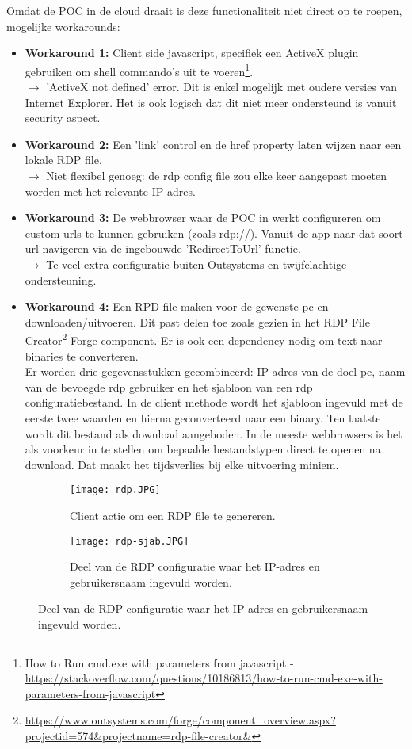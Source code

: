 Omdat de POC in de cloud draait is deze functionaliteit niet direct op te roepen, mogelijke workarounds:
\begin{itemize}
    \item \textbf{Workaround 1:} Client side javascript, specifiek een ActiveX plugin gebruiken om shell commando's uit te voeren\footnote{How to Run cmd.exe with parameters from javascript - \url{https://stackoverflow.com/questions/10186813/how-to-run-cmd-exe-with-parameters-from-javascript}}.\\
    $\rightarrow$ 'ActiveX not defined' error. Dit is enkel mogelijk met oudere versies van Internet Explorer. Het is ook logisch dat dit niet meer ondersteund is vanuit security aspect.
    \item \textbf{Workaround 2:} Een 'link' control en de href property laten wijzen naar een lokale RDP file.\\
    $\rightarrow$ Niet flexibel genoeg: de rdp config file zou elke keer aangepast moeten worden met het relevante IP-adres.
    \item \textbf{Workaround 3:} De webbrowser waar de POC in werkt configureren om custom urls te kunnen gebruiken (zoals rdp://). Vanuit de app naar dat soort url navigeren via de ingebouwde 'RedirectToUrl' functie.\\
    $\rightarrow$ Te veel extra configuratie buiten Outsystems en twijfelachtige ondersteuning.
    \item \textbf{Workaround 4:} Een RPD file maken voor de gewenste pc en downloaden/uitvoeren. Dit past delen toe zoals gezien in het RDP File Creator\footnote{\url{https://www.outsystems.com/forge/component_overview.aspx?projectid=574&projectname=rdp-file-creator&}} Forge component. Er is ook een dependency nodig om text naar binaries te converteren.\\
    Er worden drie gegevensstukken gecombineerd: IP-adres van de doel-pc, naam van de bevoegde rdp gebruiker en het sjabloon van een rdp configuratiebestand. In de client methode wordt het sjabloon ingevuld met de eerste twee waarden en hierna geconverteerd naar een binary. Ten laatste wordt dit bestand als download aangeboden. In de meeste webbrowsers is het als voorkeur in te stellen om bepaalde bestandstypen direct te openen na download. Dat maakt het tijdsverlies bij elke uitvoering miniem.
\end{itemize}

\begin{figure}[h!]
    \begin{subfigure}[b]{0.8\linewidth}
        \texttt{[image: rdp.JPG]}
        \caption{Client actie om een RDP file te genereren.}
    \end{subfigure}
    \begin{subfigure}[b]{0.4\linewidth}
        \texttt{[image: rdp-sjab.JPG]}
        \caption{Deel van de RDP configuratie waar het IP-adres en gebruikersnaam ingevuld worden.}
    \end{subfigure}
    \label{fig:rdp-actie}
\end{figure}

